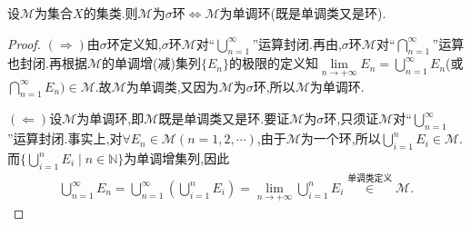 \documentclass[../../main.tex]{subfiles}%
\begin{document}
\begin{theorem}\label{theorem:集合论--定理1.3.8}
设$\mathscr{M}$为集合$X$的集类.则$\mathscr{M}$为$\sigma$环$\iff  \mathscr{M}$为单调环(既是单调类又是环).
\end{theorem}
\begin{proof}

$(\Rightarrow)$由$\sigma$环定义知,$\sigma$环$\mathscr{M}$对“$\bigcup_{n=1}^{\infty}$”运算封闭.再由,$\sigma$环$\mathscr{M}$对“$\bigcap_{n=1}^{\infty}$”运算也封闭.再根据$\mathscr{M}$的单调增(减)集列$\{E_n\}$的极限的定义知$\lim\limits_{n \to +\infty} E_n = \bigcup_{n=1}^{\infty} E_n$(或$\bigcap_{n=1}^{\infty} E_n) \in \mathscr{M}$.故$\mathscr{M}$为单调类,又因为$\mathscr{M}$为$\sigma$环,所以$\mathscr{M}$为单调环.

$(\Leftarrow)$设$\mathscr{M}$为单调环,即$\mathscr{M}$既是单调类又是环.要证$\mathscr{M}$为$\sigma$环,只须证$\mathscr{M}$对“$\bigcup_{n=1}^{\infty}$”运算封闭.事实上,对$\forall E_n \in \mathscr{M}(n=1,2,\cdots)$,由于$\mathscr{M}$为一个环,所以$\bigcup_{i=1}^{n} E_i \in \mathscr{M}$.而$\{\bigcup_{i=1}^{n} E_i \mid n \in \mathbb{N}\}$为单调增集列,因此
\begin{align*}
\bigcup_{n=1}^{\infty} E_n = \bigcup_{n=1}^{\infty} \left( \bigcup_{i=1}^{n} E_i \right) = \lim\limits_{n \to +\infty} \bigcup_{i=1}^{n} E_i \stackrel{\text{单调类定义}}{\in} \mathscr{M}.
\end{align*}

\end{proof}
\end{document}

